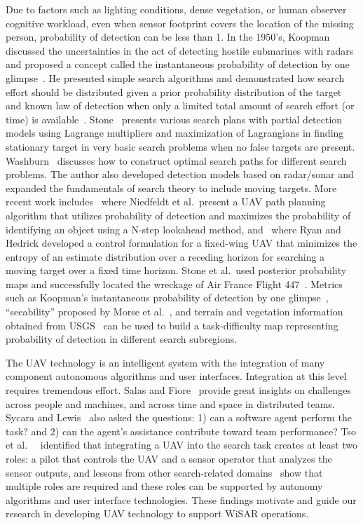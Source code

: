 Due to factors such as lighting conditions, dense vegetation, or human observer cognitive workload, even when sensor footprint covers the location of the missing person, probability of detection can be less than 1. In the 1950's, Koopman discussed the uncertainties in the act of detecting hostile submarines with radars and proposed a concept called the instantaneous probability of detection by one glimpse~\cite{Koopman1956Theory}. He presented simple search algorithms and demonstrated how search effort should be distributed given a prior probability distribution of the target and known law of detection when only a limited total amount of search effort (or time) is available~\cite{Koopman1957Theory}. Stone~\cite{Stone1975Theory} presents various search plans with partial detection models using Lagrange multipliers and maximization of Lagrangians in finding stationary target in very basic search problems when no false targets are present. Washburn~\cite{Washburn1981Search} discusses how to construct optimal search paths for different search problems. The author also developed detection models based on radar/sonar and expanded the fundamentals of search theory to include moving targets. More recent work includes~\cite{Niedfeldt2010integrated} where Niedfeldt et al.\ present a UAV path planning algorithm that utilizes probability of detection and maximizes the probability of identifying an object using a N-step lookahead method, and~\cite{Ryan2010particle} where Ryan and Hedrick developed a control formulation for a fixed-wing UAV that minimizes the entropy of an estimate distribution over a receding horizon for searching a moving target over a fixed time horizon. Stone et al.\ used posterior probability maps and successfully located the wreckage of Air France Flight 447~\cite{Stone2011Search}. Metrics such as Koopman's instantaneous probability of detection by one glimpse~\cite{Koopman1956Theory}, ``seeability'' proposed by Morse et al.\ \cite{Morse2010UAV}, and terrain and vegetation information obtained from USGS~\cite{Lin2010Bayesian} can be used to build a task-difficulty map representing probability of detection in different search subregions.

The UAV technology is an intelligent system with the integration of many component autonomous algorithms and user interfaces. Integration at this level requires tremendous effort. Salas and Fiore~ provide great insights on challenges across people and machines, and across time and space in distributed teams. Sycara and Lewis~ also asked the questions: 1) can a software agent perform the task? and 2) can the agent's assistance contribute toward team performance? Tso et al.\ ~ identified that integrating a UAV into the search task creates at least two roles: a pilot that controls the UAV and a sensor operator that analyzes the sensor outputs, and lessons from other search-related domains~\cite{Drury2003Awareness} show that multiple roles are required and these roles can be supported by autonomy algorithms and user interface technologies. These findings motivate and guide our research in developing UAV technology to support WiSAR operations.

